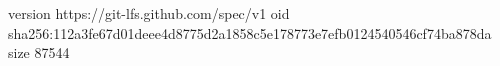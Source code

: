 version https://git-lfs.github.com/spec/v1
oid sha256:112a3fe67d01deee4d8775d2a1858c5e178773e7efb0124540546cf74ba878da
size 87544
